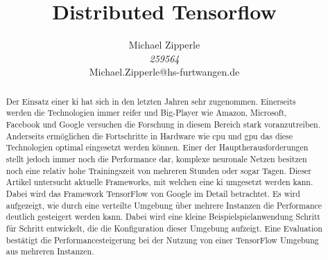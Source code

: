 \documentclass[journal]{IEEEtran}
\begin{document}
\title{Distributed Tensorflow}

\author{\begin{center}
 Michael Zipperle \\ 
 \textit{259564} \\
 Michael.Zipperle@hs-furtwangen.de \\
\end{center}}%
        

\maketitle


\begin{abstract}
Der Einsatz einer \ac{ki} hat sich in den letzten Jahren sehr zugenommen. Einerseits werden die Technologien immer reifer und Big-Player wie Amazon, Microsoft, Facebook und Google versuchen die Forschung in diesem Bereich stark voranzutreiben. Anderseits ermöglichen die Fortschritte in Hardware wie \acs{cpu} und \acs{gpu} das diese Technologien optimal eingesetzt werden können. Einer der Hauptherausforderungen stellt jedoch immer noch die Performance dar, komplexe neuronale Netzen besitzen noch eine relativ hohe Trainingszeit von mehreren Stunden oder sogar Tagen. Dieser Artikel untersucht aktuelle Frameworks, mit welchen eine \ac{ki} umgesetzt werden kann. Dabei wird das Framework TensorFlow von Google im Detail betrachtet. Es wird aufgezeigt, wie durch eine verteilte Umgebung über mehrere Instanzen die Performance deutlich gesteigert werden kann. Dabei wird eine kleine Beispielspielanwendung Schritt für Schritt entwickelt, die die Konfiguration dieser Umgebung aufzeigt. Eine Evaluation bestätigt die Performancesteigerung bei der Nutzung von einer TensorFlow Umgebung aus mehreren Instanzen. 

\end{abstract}
\IEEEpeerreviewmaketitle











\ifCLASSOPTIONcaptionsoff
  \newpage
\fi
\end{document}

